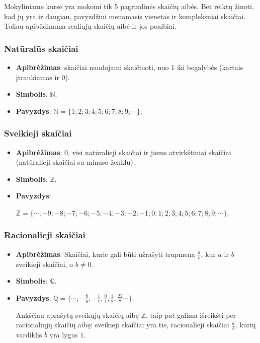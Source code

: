 \documentclass[a4paper]{article}
\begin{document}
Mokyliniame kurse yra mokomi tik 5 pagrindinės skaičių aibės. Bet reiktų
žinoti, kad jų yra ir daugiau, pavyzdžiui menamasis vienetas ir kompleksniai
skaičiai. Toliau apibūdinama realiųjų skaičių aibė ir jos poaibiai.

\subsubsection{Natūralūs skaičiai}

\begin{itemize}
      \item \textbf{Apibrėžimas}: skaičiai naudojami skaičiuoti, nuo 1 iki
            begalybės (kartais įtraukiamas ir 0).
      \item \textbf{Simbolis}: $\mathbb{N}$.
      \item \textbf{Pavyzdys}: $\mathbb{N}=\{1;2;3;4;5;6;7;8;9;\cdots\}$.
\end{itemize}

\subsubsection{Sveikieji skaičiai}

\begin{itemize}
      \item \textbf{Apibrėžimas}: 0, visi natūralieji skaičiai ir jiems
            atvirkštiniai skaičiai (natūralieji skaičiai su minuso ženklu).
      \item \textbf{Simbolis}: $\mathbb{Z}$.
      \item \textbf{Pavyzdys}:

            $\mathbb{Z}=\{\cdots;-9;-8;-7;-6;-5;-4;-3;-2;-1;0;1;2;3;4;5;6;7;8;9;\cdots\}$.
\end{itemize}

\subsubsection{Racionalieji skaičiai}

\begin{itemize}
      \item \textbf{Apibrėžimas}: Skaičiai, kurie gali būti užrašyti trupmena
            $\frac{a}{b}$, kur $a$ ir $b$ sveikieji skaičiai, o $b \neq 0$.
      \item \textbf{Simbolis}: $\mathbb{Q}$.
      \item \textbf{Pavyzdys}: $\mathbb{Q}=\{\cdots;-\frac{8}{6}, -\frac{1}{1},
                  \frac{0}{1}, \frac{1}{2}, \frac{22}{7}\cdots\}$.

            Ankščiau aprašytą sveikųjų skaičių aibę $\mathbb{Z}$, taip pat
            galima
            išreikšti per racionaliųjų skaičių aibę: sveikieji skaičiai yra
            tie,
            racionalieji skaičiai $\frac{a}{b}$, kurių vardiklis $b$ yra lygus
            $1$.
\end{itemize}
\end{document}
